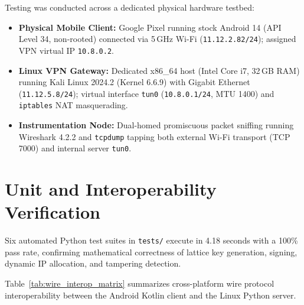 Testing was conducted across a dedicated physical hardware testbed:
\begin{itemize}
    \item \textbf{Physical Mobile Client:} Google Pixel running stock Android 14 (API Level 34, non-rooted) connected via 5\,GHz Wi-Fi (\texttt{11.12.2.82/24}); assigned VPN virtual IP \texttt{10.8.0.2}.
    \item \textbf{Linux VPN Gateway:} Dedicated x86\_64 host (Intel Core i7, 32\,GB RAM) running Kali Linux 2024.2 (Kernel 6.6.9) with Gigabit Ethernet (\texttt{11.12.5.8/24}); virtual interface \texttt{tun0} (\texttt{10.8.0.1/24}, MTU 1400) and \texttt{iptables} NAT masquerading.
    \item \textbf{Instrumentation Node:} Dual-homed promiscuous packet sniffing running Wireshark 4.2.2 and \texttt{tcpdump} tapping both external Wi-Fi transport (TCP 7000) and internal server \texttt{tun0}.
\end{itemize}

\section{Unit and Interoperability Verification}
\label{sec:unit_interoperability_testing}

Six automated Python test suites in \texttt{tests/} execute in 4.18 seconds with a 100\% pass rate, confirming mathematical correctness of lattice key generation, signing, dynamic IP allocation, and tampering detection.

Table~\ref{tab:wire_interop_matrix} summarizes cross-platform wire protocol interoperability between the Android Kotlin client and the Linux Python server.

